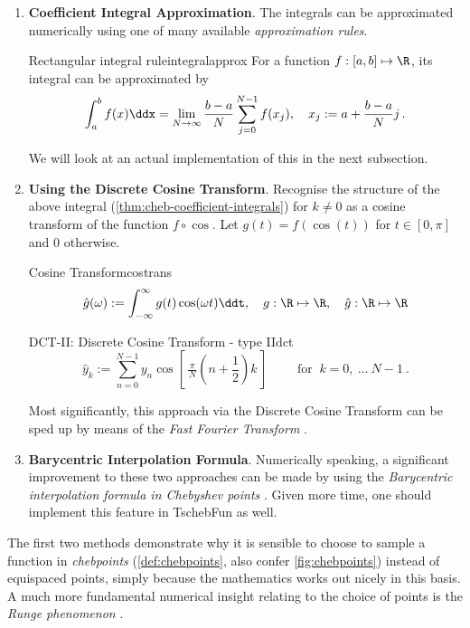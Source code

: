 \documentclass[12pt, a4paper]{article}
\begin{document}
  \begin{enumerate}
    \item \textbf{Coefficient Integral Approximation}.
          The integrals can be approximated numerically using one of many available \textit{approximation rules}.
          \begin{theorem}{Rectangular integral rule}{integralapprox}
            For a function $f: [a, b] \mapsto \R$, its integral can be approximated by
            $$\int_a^b f(x) \ddx = \lim_{N \rightarrow \infty} \frac{b-a}{N} \sum_{j=0}^{N-1} f(x_j), \quad x_j := a + \frac{b-a}{N} j \,.$$
          \end{theorem}
          We will look at an actual implementation of this in the next subsection.

    \item \textbf{Using the Discrete Cosine Transform}.
          Recognise the structure of the above integral (\cref{thm:cheb-coefficient-integrals}) for $k \neq 0$ as a cosine transform of the function $f \circ \cos$. Let $g(t) = f(\cos(t))$ for $t \in [0, \pi]$ and $0$ otherwise.

          \begin{definition}{Cosine Transform}{costrans}
            $$\hat{g}(\omega) := \int_{-\infty}^{\infty} g(t) \cos(\omega t) \ddt, \quad g: \R \mapsto \R, \quad \hat{g}: \R \mapsto \R$$
          \end{definition}

          \begin{definition}{DCT-II: Discrete Cosine Transform - type II}{dct}
            $$\hat{y}_k := \sum _{n=0}^{N-1}y_{n}\cos \left[\,{\tfrac {\,\pi \,}{N}}\left(n+{\frac {1}{2}}\right)k\,\right]\qquad {\text{ for }}~k=0,\ \dots \ N-1~.$$
          \end{definition}

          Most significantly, this approach via the Discrete Cosine Transform can be sped up by means of the \emph{Fast Fourier Transform} \parencite{cooley-tukey-fft}.

    \item \textbf{Barycentric Interpolation Formula}.
          Numerically speaking, a significant improvement to these two approaches can be made by using the \emph{Barycentric interpolation formula in Chebyshev points} \parencite{atap}. Given more time, one should implement this feature in \textcolor{themecolor3}{TschebFun} as well.
  \end{enumerate}

  The first two methods demonstrate why it is sensible to choose to sample a function in \textit{chebpoints} (\cref{def:chebpoints}, also confer \cref{fig:chebpoints}) instead of equispaced points, simply because the mathematics works out nicely in this basis.
  A much more fundamental numerical insight relating to the choice of points is the \emph{Runge phenomenon} \parencite{runge-phenomenon}.
\end{document}
